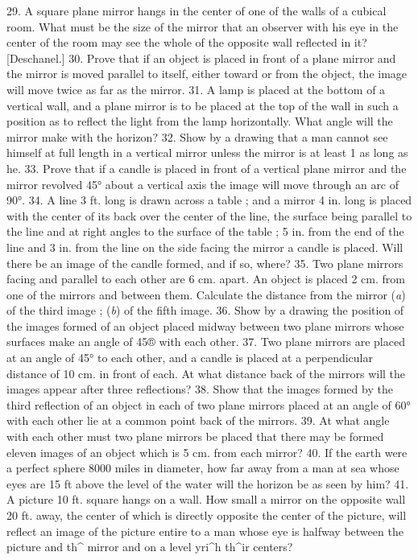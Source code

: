 29. A square plane mirror hangs in the center of one of the walls of a cubical room. What must be the size of the mirror that an observer with his eye in the center of the room may see the whole of the opposite wall reflected in it? [Deschanel.]
30. Prove that if an object is placed in front of a plane mirror and the mirror is moved parallel to itself, either toward or from the object, the image will move twice as far as the mirror.
31. A lamp is placed at the bottom of a vertical wall, and a plane mirror is to be placed at the top of the wall in such a position as to reflect the light from the lamp horizontally. What angle will the mirror make with the horizon?
32. Show by a drawing that a man cannot see himself at full length in a vertical mirror unless the mirror is at least 1 as long as he.
33. Prove that if a candle is placed in front of a vertical plane mirror and the mirror revolved 45° about a vertical axis the image will move through an arc of 90°.
34. A line 3 ft. long is drawn across a table ; and a mirror 4 in. long is placed with the center of its back over the center of the line, the surface being parallel to the line and at right angles to the surface of the table ; 5 in. from the end of the line and 3 in. from the line on the side facing the mirror a candle is placed. Will there be an image of the candle formed, and if so, where?
35. Two plane mirrors facing and parallel to each other are 6 cm. apart. An object is placed 2 cm. from one of the mirrors and between them. Calculate the distance from the mirror (\emph{a}) of the third image ; (\emph{b}) of the fifth image.
36. Show by a drawing the position of the images formed of an object placed midway between two plane mirrors whose surfaces make an angle of 45® with each other.
37. Two plane mirrors are placed at an angle of 45° to each other, and a candle is placed at a perpendicular distance of 10 cm. in front of each. At what distance back of the mirrors will the images appear after three reflections?
38. Show that the images formed by the third reflection of an object in each of two plane mirrors placed at an angle of 60° with each other lie at a common point back of the mirrors.
39. At what angle with each other must two plane mirrors be placed that there may be formed eleven images of an object which is 5 cm. from each mirror?
40. If the earth were a perfect sphere 8000 miles in diameter, how far away from a man at sea whose eyes are 15 ft above the level of the water will the horizon be as seen by him?
41. A picture 10 ft. square hangs on a wall. How small a mirror on the opposite wall 20 ft. away, the center of which is directly opposite the center of the picture, will reflect an image of the picture entire to a man whose eye is halfway between the picture and th^ mirror and on a level yri^h th^ir centers?
